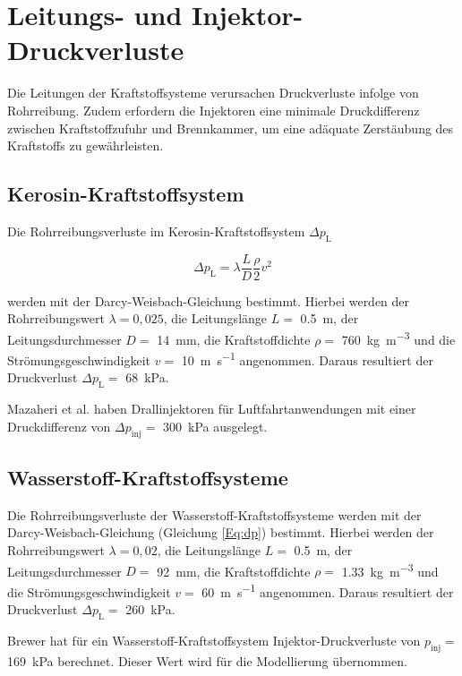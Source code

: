 \section{Leitungs- und Injektor-Druckverluste}

Die Leitungen der Kraftstoffsysteme verursachen Druckverluste infolge von Rohrreibung. Zudem erfordern die Injektoren eine minimale Druckdifferenz zwischen Kraftstoffzufuhr und Brennkammer, um eine adäquate Zerstäubung des Kraftstoffs zu gewährleisten.

\subsection{Kerosin-Kraftstoffsystem}

Die Rohrreibungsverluste im Kerosin-Kraftstoffsystem $\Delta p_\mathrm{L}$ 

\begin{equation}\label{Eq:dp}
	\Delta p_\mathrm{L}=\lambda\frac{L}{D}\frac{\rho}{2}v^2
\end{equation}

werden mit der Darcy-Weisbach-Gleichung bestimmt. Hierbei werden der Rohrreibungswert $\lambda=0,025$, die Leitungslänge $L=$ \SI{0.5}{\m}, der Leitungsdurchmesser $D=$ \SI{14}{\milli\m}, die Kraftstoffdichte $\rho=$ \SI{760}{\kg\per\m\cubed} und die Strömungsgeschwindigkeit $v=$ \SI{10}{\m\per\s} angenommen. Daraus resultiert der Druckverlust $\Delta p_\mathrm{L}=$ \SI{68}{\kilo\Pa}. 

Mazaheri et al. \cite{Mazaheri.2012} haben Drallinjektoren für Luftfahrtanwendungen mit einer Druckdifferenz von $\Delta p_{\mathrm{inj}}=$ \SI{300}{\kilo\Pa} ausgelegt.

\subsection{Wasserstoff-Kraftstoffsysteme}

Die Rohrreibungsverluste der Wasserstoff-Kraftstoffsysteme werden mit der Darcy-Weisbach-Gleichung (Gleichung \ref{Eq:dp}) bestimmt. Hierbei werden der Rohrreibungswert $\lambda=0,02$, die Leitungslänge $L=$ \SI{0.5}{\m}, der Leitungsdurchmesser $D=$ \SI{92}{\milli\m}, die Kraftstoffdichte $\rho=$ \SI{1.33}{\kg\per\m\cubed} und die Strömungsgeschwindigkeit $v=$ \SI{60}{\m\per\s} angenommen. Daraus resultiert der Druckverlust $\Delta p_\mathrm{L}=$ \SI{260}{\kilo\Pa}. 


Brewer \cite{Brewer.1991} hat für ein Wasserstoff-Kraftstoffsystem Injektor-Druckverluste von $p_{\mathrm{inj}}=$ \SI{169}{\kilo\Pa} berechnet. Dieser Wert wird für die Modellierung übernommen.

